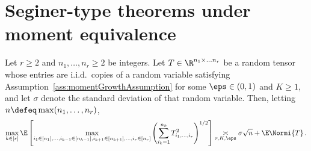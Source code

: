 \documentclass[11pt,a4paper]{article}
\begin{document}
\section{Seginer-type theorems under moment equivalence}
\label{sec:equivalenceSeginer}
\begin{proposition} \label{prop:proofSeginerEquivalence}
    Let $r\ge 2$ and $n_1, \ldots, n_r\ge 2$ be integers.
    Let $T\in \R^{n_1\times \ldots n_r}$ be a random tensor whose entries
    are i.i.d.\ copies of a random variable satisfying Assumption~\ref{ass:momentGrowthAssumption}
    for some $\eps\in (0,1)$ and $K\ge 1$,
    and let $\sigma$ denote the standard deviation of that random variable. Then, letting $n\defeq \max(n_1, \ldots, n_r)$,
    \[
        \max_{k\in [r]} \E \left[\max_{\substack{i_1\in [n_1], \ldots, i_{k-1}\in [n_{k-1}], i_{k+1}\in [n_{k+1}], \ldots, i_r\in [n_r]}} \left(\sum_{i_k=1}^{n_k} T_{i_1, \ldots, i_r}^2\right)^{1/2}\right] \underset{r,K,\eps}\asymp \sigma \sqrt n + \E \Normi{T}\,.
    \]
\end{proposition}
\end{document}
